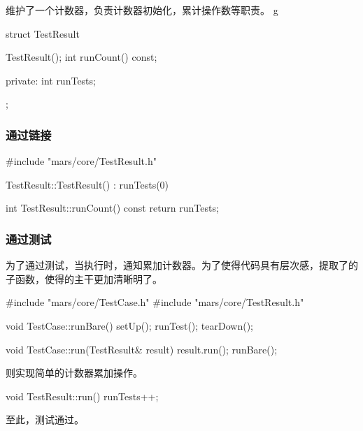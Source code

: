 \begin{content}
维护了一个计数器，负责计数器初始化，累计操作数等职责。
g

\begin{leftbar}
 \begin{c++}[caption={\ttfamily{include/mars/core/TestResult.h}}]
struct TestResult {
  TestResult();
  int runCount() const;

private:
  int runTests;
};
 \end{c++}
\end{leftbar}

\subsubsection{通过链接}

\begin{leftbar}
 \begin{c++}[caption={\ttfamily{src/mars/core/TestResult.cc}}]
#include "mars/core/TestResult.h"

TestResult::TestResult() : runTests(0) {
}

int TestResult::runCount() const {
  return runTests;
}
 \end{c++}
\end{leftbar}

\subsubsection{通过测试}

为了通过测试，当执行时，通知累加计数器。为了使得代码具有层次感，提取了的子函数，使得的主干更加清晰明了。

\begin{leftbar}
 \begin{c++}[caption={\ttfamily{src/mars/core/TestCase.cc}}]
#include "mars/core/TestCase.h"
#include "mars/core/TestResult.h"

void TestCase::runBare() {
  setUp();
  runTest();
  tearDown();
}

void TestCase::run(TestResult& result) {
  result.run();
  runBare();
}
 \end{c++}
\end{leftbar}

则实现简单的计数器累加操作。

\begin{leftbar}
 \begin{c++}[caption={\ttfamily{src/mars/core/TestResult.cc}}]
void TestResult::run() {
  runTests++;
}
 \end{c++}
\end{leftbar}

至此，测试通过。

\end{content}

